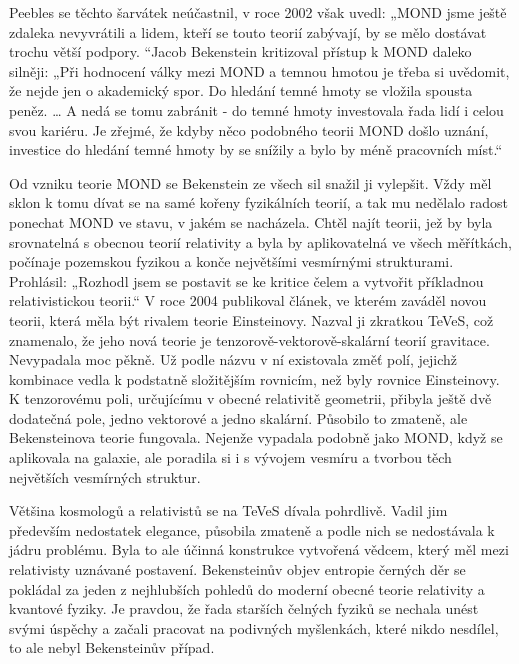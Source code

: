   Peebles se těchto šarvátek neúčastnil, v roce 2002 však uvedl: „MOND jsme ještě zdaleka
  nevyvrátili a lidem, kteří se touto teorií zabývají, by se mělo dostávat trochu větší podpory.
  “Jacob Bekenstein kritizoval přístup k MOND daleko silněji: „Při hodnocení války mezi MOND a
  temnou hmotou je třeba si uvědomit, že nejde jen o akademický spor. Do hledání temné hmoty se
  vložila spousta peněz. … A nedá se tomu zabránit - do temné hmoty investovala řada lidí i celou
  svou kariéru. Je zřejmé, že kdyby něco podobného teorii MOND došlo uznání, investice do hledání
  temné hmoty by se snížily a bylo by méně pracovních míst.“
  
  Od vzniku teorie MOND se Bekenstein ze všech sil snažil ji vylepšit. Vždy měl sklon k tomu dívat
  se na samé kořeny fyzikálních teorií, a tak mu nedělalo radost ponechat MOND ve stavu, v jakém se
  nacházela. Chtěl najít teorii, jež by byla srovnatelná s obecnou teorií relativity a byla by
  aplikovatelná ve všech měřítkách, počínaje pozemskou fyzikou a konče největšími vesmírnými
  strukturami. Prohlásil: „Rozhodl jsem se postavit se ke kritice čelem a vytvořit příkladnou
  relativistickou teorii.“ V roce 2004 publikoval článek, ve kterém zaváděl novou teorii, která měla
  být rivalem teorie Einsteinovy. Nazval ji zkratkou TeVeS, což znamenalo, že jeho nová teorie je
  tenzorově-vektorově-skalární teorií gravitace. Nevypadala moc pěkně. Už podle názvu v ní
  existovala změť polí, jejichž kombinace vedla k podstatně složitějším rovnicím, než byly rovnice
  Einsteinovy. K tenzorovému poli, určujícímu v obecné relativitě geometrii, přibyla ještě dvě
  dodatečná pole, jedno vektorové a jedno skalární. Působilo to zmateně, ale Bekensteinova teorie
  fungovala. Nejenže vypadala podobně jako MOND, když se aplikovala na galaxie, ale poradila si i s
  vývojem vesmíru a tvorbou těch největších vesmírných struktur. 
  
  Většina kosmologů a relativistů se na TeVeS dívala pohrdlivě. Vadil jim především nedostatek
  elegance, působila zmateně a podle nich se nedostávala k jádru problému. Byla to ale účinná
  konstrukce vytvořená vědcem, který měl mezi relativisty uznávané postavení. Bekensteinův objev
  entropie černých děr se pokládal za jeden z nejhlubších pohledů do moderní obecné teorie
  relativity a kvantové fyziky. Je pravdou, že řada starších čelných fyziků se nechala unést svými
  úspěchy a začali pracovat na podivných myšlenkách, které nikdo nesdílel, to ale nebyl Bekensteinův
  případ. 
  
